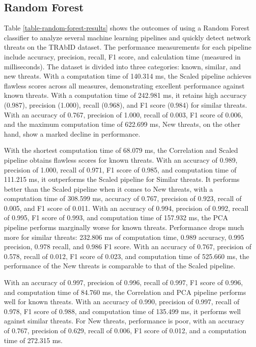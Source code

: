 \subsection{Random Forest}
Table \ref{table-random-forest-results} shows the outcomes of using a Random Forest classifier to analyze several machine learning pipelines and quickly detect network threats on the TRAbID dataset. The performance measurements for each pipeline include accuracy, precision, recall, F1 score, and calculation time (measured in milliseconds). The dataset is divided into three categories: known, similar, and new threats. With a computation time of 140.314 ms, the Scaled pipeline achieves flawless scores across all measures, demonstrating excellent performance against known threats. With a computation time of 242.981 ms, it retains high accuracy (0.987), precision (1.000), recall (0.968), and F1 score (0.984) for similar threats. With an accuracy of 0.767, precision of 1.000, recall of 0.003, F1 score of 0.006, and the maximum computation time of 622.699 ms, New threats, on the other hand, show a marked decline in performance.



With the shortest computation time of 68.079 ms, the Correlation and Scaled pipeline obtains flawless scores for known threats. With an accuracy of 0.989, precision of 1.000, recall of 0.971, F1 score of 0.985, and computation time of 111.215 ms, it outperforms the Scaled pipeline for Similar threats. It performs better than the Scaled pipeline when it comes to New threats, with a computation time of 308.599 ms, accuracy of 0.767, precision of 0.923, recall of 0.005, and F1 score of 0.011. With an accuracy of 0.994, precision of 0.992, recall of 0.995, F1 score of 0.993, and computation time of 157.932 ms, the PCA pipeline performs marginally worse for known threats. Performance drops much more for similar threats: 232.806 ms of computation time, 0.989 accuracy, 0.995 precision, 0.978 recall, and 0.986 F1 score. With an accuracy of 0.767, precision of 0.578, recall of 0.012, F1 score of 0.023, and computation time of 525.660 ms, the performance of the New threats is comparable to that of the Scaled pipeline.

With an accuracy of 0.997, precision of 0.996, recall of 0.997, F1 score of 0.996, and computation time of 84.760 ms, the Correlation and PCA pipeline performs well for known threats. With an accuracy of 0.990, precision of 0.997, recall of 0.978, F1 score of 0.988, and computation time of 135.499 ms, it performs well against similar threats. For New threats, performance is poor, with an accuracy of 0.767, precision of 0.629, recall of 0.006, F1 score of 0.012, and a computation time of 272.315 ms.

